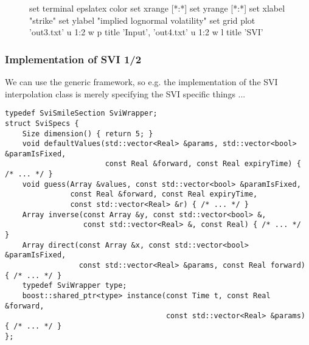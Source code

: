 \documentclass{beamer}
\begin{document}

\begin{frame}[fragile]
\begin{figure}
	 \begin{gnuplot}
	 	set terminal epslatex color
        set xrange [*:*]
        set yrange [*:*]
        set xlabel "strike"
        set ylabel "implied lognormal volatility"
        set grid
        plot 'out3.txt' u 1:2 w p title 'Input', 'out4.txt' u 1:2 w l title 'SVI'
	 \end{gnuplot}
\end{figure}
\end{frame}


\begin{frame}[fragile]
\frametitle{Implementation of SVI 1/2}
We can use the generic framework, so e.g. the implementation of the SVI interpolation class is merely specifying the SVI specific things ...

\begin{verbatim}
typedef SviSmileSection SviWrapper;
struct SviSpecs {
    Size dimension() { return 5; }
    void defaultValues(std::vector<Real> &params, std::vector<bool> &paramIsFixed,
                       const Real &forward, const Real expiryTime) { /* ... */ }
    void guess(Array &values, const std::vector<bool> &paramIsFixed,
               const Real &forward, const Real expiryTime,
               const std::vector<Real> &r) { /* ... */ }
    Array inverse(const Array &y, const std::vector<bool> &,
                  const std::vector<Real> &, const Real) { /* ... */  }
    Array direct(const Array &x, const std::vector<bool> &paramIsFixed,
                 const std::vector<Real> &params, const Real forward) { /* ... */ }
    typedef SviWrapper type;
    boost::shared_ptr<type> instance(const Time t, const Real &forward,
                                     const std::vector<Real> &params) { /* ... */ }
};
\end{verbatim}
\end{frame}
\end{document}
